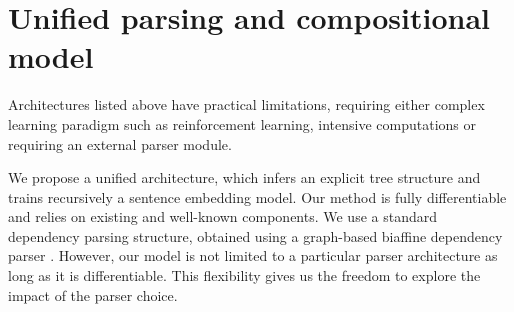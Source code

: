 
\section{Unified parsing and compositional model}

Architectures listed above  have practical limitations, requiring either complex learning paradigm such as reinforcement learning, intensive computations or requiring an external parser module.

We propose a unified architecture, which infers an explicit tree structure and trains recursively a sentence embedding model. Our method is fully differentiable and relies on existing and well-known components. We use a standard dependency parsing structure, obtained using a graph-based biaffine dependency parser \parencite{dozat_17}. However, our model is not limited to a particular parser architecture as long as it is differentiable. This flexibility gives us the freedom to explore the impact of the parser choice.

